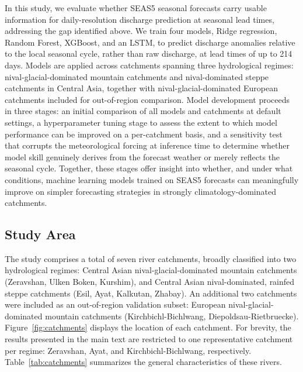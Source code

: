 \documentclass[review,12pt,authoryear]{elsarticle}
\begin{document}
In this study, we evaluate whether SEAS5 seasonal forecasts carry usable information for daily-resolution discharge prediction at seasonal lead times, addressing the gap identified above. We train four models, Ridge regression, Random Forest, XGBoost, and an LSTM, to predict discharge anomalies relative to the local seasonal cycle, rather than raw discharge, at lead times of up to 214 days. Models are applied across catchments spanning three hydrological regimes: nival-glacial-dominated mountain catchments and nival-dominated steppe catchments in Central Asia, together with nival-glacial-dominated European catchments included for out-of-region comparison. Model development proceeds in three stages: an initial comparison of all models and catchments at default settings, a hyperparameter tuning stage to assess the extent to which model performance can be improved on a per-catchment basis, and a sensitivity test that corrupts the meteorological forcing at inference time to determine whether model skill genuinely derives from the forecast weather or merely reflects the seasonal cycle. Together, these stages offer insight into whether, and under what conditions, machine learning models trained on SEAS5 forecasts can meaningfully improve on simpler forecasting strategies in strongly climatology-dominated catchments.

\subsection{Study Area}

The study comprises a total of seven river catchments, broadly classified into two hydrological regimes: Central Asian nival-glacial-dominated mountain catchments (Zeravshan, Ulken Boken, Kurshim), and Central Asian nival-dominated, rainfed steppe catchments (Esil, Ayat, Kalkutan, Zhabay). An additional two catchments were included as an out-of-region validation subset: European nival-glacial-dominated mountain catchments (Kirchbichl-Bichlwang, Diepoldsau-Rietbruecke). Figure~\ref{fig:catchments} displays the location of each catchment. For brevity, the results presented in the main text are restricted to one representative catchment per regime: Zeravshan, Ayat, and Kirchbichl-Bichlwang, respectively. Table~\ref{tab:catchments} summarizes the general characteristics of these rivers.
\end{document}
